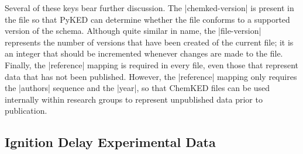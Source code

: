 \documentclass[12pt]{ijck}
\newcommand\ck{ChemKED}
\begin{document}
Several of these keys bear further discussion. The \yabox|chemked-version| is present in the file so
that PyKED can determine whether the file conforms to a supported version of the schema. Although
quite similar in name, the \yabox|file-version| represents the number of versions that have been
created of the current file; it is an integer that should be incremented whenever changes are made
to the file. Finally, the \yabox|reference| mapping is required in every file, even those that
represent data that has not been published. However, the \yabox|reference| mapping only requires the
\yabox|authors| sequence and the \yabox|year|, so that \ck{} files can be used internally within
research groups to represent unpublished data prior to publication.

\subsection{Ignition Delay Experimental Data}\label{sec:ignition-delay-experimental-data}
\end{document}
